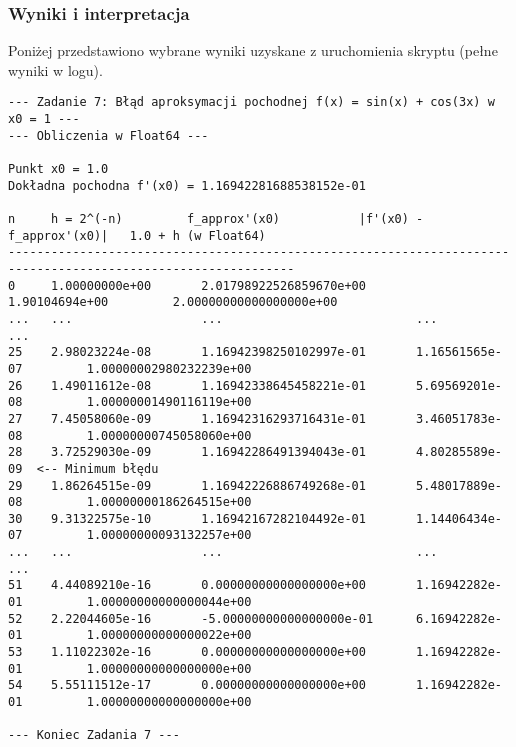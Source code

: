 \documentclass[11pt, a4paper]{article}
\begin{document}
\subsubsection{Wyniki i interpretacja}
Poniżej przedstawiono wybrane wyniki uzyskane z uruchomienia skryptu (pełne wyniki w logu).
\begin{verbatim}
--- Zadanie 7: Błąd aproksymacji pochodnej f(x) = sin(x) + cos(3x) w x0 = 1 ---
--- Obliczenia w Float64 ---

Punkt x0 = 1.0
Dokładna pochodna f'(x0) = 1.16942281688538152e-01

n     h = 2^(-n)         f_approx'(x0)           |f'(x0) - f_approx'(x0)|   1.0 + h (w Float64)
--------------------------------------------------------------------------------------------------------------
0     1.00000000e+00       2.01798922526859670e+00       1.90104694e+00         2.00000000000000000e+00
...   ...                  ...                           ...                    ...
25    2.98023224e-08       1.16942398250102997e-01       1.16561565e-07         1.00000002980232239e+00
26    1.49011612e-08       1.16942338645458221e-01       5.69569201e-08         1.00000001490116119e+00
27    7.45058060e-09       1.16942316293716431e-01       3.46051783e-08         1.00000000745058060e+00
28    3.72529030e-09       1.16942286491394043e-01       4.80285589e-09  <-- Minimum błędu
29    1.86264515e-09       1.16942226886749268e-01       5.48017889e-08         1.00000000186264515e+00
30    9.31322575e-10       1.16942167282104492e-01       1.14406434e-07         1.00000000093132257e+00
...   ...                  ...                           ...                    ...
51    4.44089210e-16       0.00000000000000000e+00       1.16942282e-01         1.00000000000000044e+00
52    2.22044605e-16       -5.00000000000000000e-01      6.16942282e-01         1.00000000000000022e+00
53    1.11022302e-16       0.00000000000000000e+00       1.16942282e-01         1.00000000000000000e+00
54    5.55111512e-17       0.00000000000000000e+00       1.16942282e-01         1.00000000000000000e+00

--- Koniec Zadania 7 ---
\end{verbatim}
\end{document}
